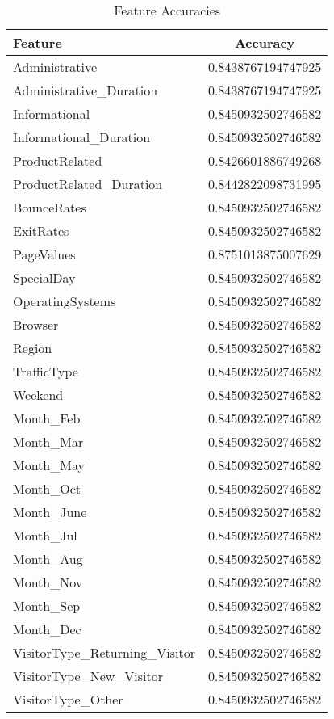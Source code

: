 \documentclass{article}
\begin{document}
\begin{table}[H]
\centering
\begin{tabular}{|l|c|}
\hline
Feature & Accuracy \\
\hline
Administrative & 0.8438767194747925 \\
Administrative\_Duration & 0.8438767194747925 \\
Informational & 0.8450932502746582 \\
Informational\_Duration & 0.8450932502746582 \\
ProductRelated & 0.8426601886749268 \\
ProductRelated\_Duration & 0.8442822098731995 \\
BounceRates & 0.8450932502746582 \\
ExitRates & 0.8450932502746582 \\
PageValues & 0.8751013875007629 \\
SpecialDay & 0.8450932502746582 \\
OperatingSystems & 0.8450932502746582 \\
Browser & 0.8450932502746582 \\
Region & 0.8450932502746582 \\
TrafficType & 0.8450932502746582 \\
Weekend & 0.8450932502746582 \\
Month\_Feb & 0.8450932502746582 \\
Month\_Mar & 0.8450932502746582 \\
Month\_May & 0.8450932502746582 \\
Month\_Oct & 0.8450932502746582 \\
Month\_June & 0.8450932502746582 \\
Month\_Jul & 0.8450932502746582 \\
Month\_Aug & 0.8450932502746582 \\
Month\_Nov & 0.8450932502746582 \\
Month\_Sep & 0.8450932502746582 \\
Month\_Dec & 0.8450932502746582 \\
VisitorType\_Returning\_Visitor & 0.8450932502746582 \\
VisitorType\_New\_Visitor & 0.8450932502746582 \\
VisitorType\_Other & 0.8450932502746582 \\
\hline
\end{tabular}
\caption{Feature Accuracies}
\label{tab:my_label}
\end{table}
\end{document}
